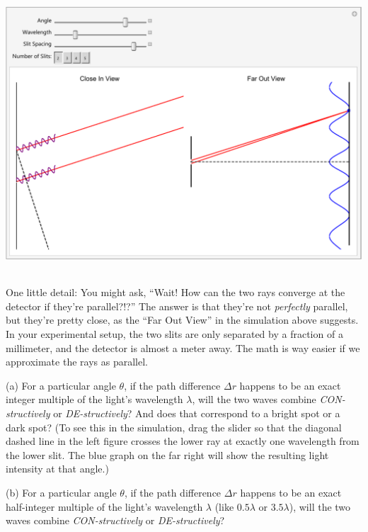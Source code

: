 {\centering \includegraphics[height=4.1in]{interference_of_light/screengrab.pdf} \par}

One little detail: You might ask, ``Wait!  How can the two rays converge at the detector if they're parallel?!?''  The answer is that they're not \textit{perfectly} parallel, but they're pretty close, as the ``Far Out View'' in the simulation above suggests.  In your experimental setup, the two slits are only separated by a fraction of a millimeter, and the detector is almost a meter away.  The math is way easier if we approximate the rays as parallel.


\pagebreak[2]
(a) For a particular angle $\theta$, if the path difference $\Delta r$ happens to be an exact integer multiple of the light's wavelength $\lambda$, will the two waves combine \textit{CON-structively} or \textit{DE-structively}?  And does that correspond to a bright spot or a dark spot?  (To see this in the simulation, drag the  slider so that the diagonal dashed line in the left figure crosses the lower ray at exactly one wavelength from the lower slit.  The blue graph on the far right will show the resulting light intensity at that angle.)
\answerspace{0.5in}

(b) For a particular angle $\theta$, if the path difference $\Delta r$ happens to be an exact half-integer multiple of the light's wavelength $\lambda$ (like $0.5\lambda$ or $3.5\lambda$), will the two waves combine \textit{CON-structively} or \textit{DE-structively}?
\answerspace{0.5in}

